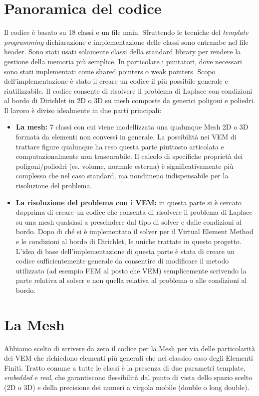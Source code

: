 \documentclass[oneside,12pt]{book}  %
\theoremstyle{plain}
\theoremstyle{definition}
\theoremstyle{remark}
\numberwithin{equation}{chapter} %
\begin{document}
\section{Panoramica del codice}
\label{sec:panoramica}
Il codice \`e basato su 18 classi e un file main. Sfruttendo le
tecniche del \textit{template programming} dichiarazione e
implementazione delle classi sono entrambe nel file header.
Sono stati usati solamente classi della standard library per rendere
la gestione della memoria pi\`u semplice. In particolare i puntatori,
dove necessari sono stati implementati come shared pointers o weak
pointers. 
Scopo dell'implementazione \`e stato il creare un codice il pi\`u
possibile generale e riutilizzabile. Il codice consente di risolvere
il problema di Laplace con condizioni al bordo di Dirichlet in 2D o 3D
su mesh composte da generici poligoni e poliedri.
Il lavoro \`e diviso idealmente in due parti principali:
\begin{itemize}
\item
\textbf{La mesh:} 7 classi con cui viene modellizzata una qualunque
Mesh 2D o 3D formata da elementi non convessi in generale. La
possibilit\`a nei VEM di trattare figure qualunque ha
reso questa parte piuttosto articolata e computazionalmente non
trascurabile. Il calcolo di specifiche propriet\`a dei
poligoni/poliedri (es. volume, normale esterna) \`e significativamente
pi\`u complesso che nel caso standard, ma nondimeno indispensabile per
la risoluzione del problema.

\item
\textbf{La risoluzione del problema con i VEM:} in questa parte si \`e
cercato dapprima di creare un codice che consenta di risolvere il
problema di Laplace su una mesh qualsiasi a prescindere dal tipo di
solver e dalle condizioni al bordo. Dopo di ch\'e si \`e implementato
il solver per il Virtual Element Method e le condizioni al bordo di
Dirichlet, le uniche trattate in questo progetto.
L'idea di base dell'implementazione di questa parte \`e stata di
creare un codice sufficientemente generale da consentire di modificare
il metodo utilizzato (ad esempio FEM al posto che VEM) semplicemente
scrivendo la parte relativa al solver e non quella relativa al
problema o alle condizioni al bordo.

\end{itemize}


\section{La Mesh}
\label{sec:mesh}
Abbiamo scelto di scrivere da zero il codice per la Mesh per via delle
particolarit\`a dei VEM che richiedono elementi pi\`u generali che nel
classico caso degli Elementi Finiti. Tratto comune a tutte le classi
\`e la presenza di due parametri template, \textit{embedded} e
\textit{real}, che garantiscono flessibilit\`a dal punto di vista
dello spazio scelto (2D o 3D) e della precisione dei numeri a virgola
mobile (double o long double). 
\end{document}
